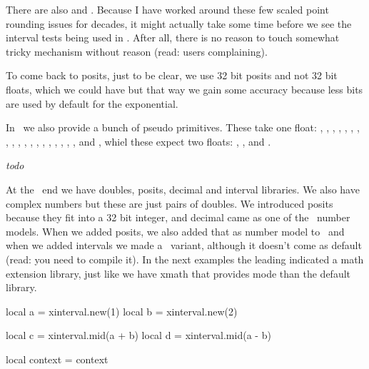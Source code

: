 \startpacked\darkblue \tttf \getbuffer \stoppacked

There are also \typ {\ifintervalfloat} and \typ{\ifintervalnum}. Because I have
worked around these few scaled point rounding issues for decades, it might
actually take some time before we see the interval tests being used in \CONTEXT.
After all, there is no reason to touch somewhat tricky mechanism without reason
(read: users complaining).

To come back to posits, just to be clear, we use 32 bit posits and not 32 bit
floats, which we could have but that way we gain some accuracy because less bits
are used by default for the exponential.

In \CONTEXT\ we also provide a bunch of pseudo primitives. These take one float:
\type {\pfsin}, \type {\pfcos}, \type {\pftan}, \type {\pfasin}, \type {\pfacos},
\type {\pfatan}, \type {\pfsinh}, \type {\pfcosh}, \type {\pftanh}, \type
{\pfasinh}, \type {\pfacosh}, \type {\pfatanh}, \type {\pfsqrt}, \type {\pflog},
\type {\pfexp}, \type {\pfceil}, \type {\pffloor}, \type {\pfround}, \type
{\pfabs}, \type {\pfrad} and \type {\pfdeg}, whiel these expect two floats: \type
{\pfatantwo}, \type {\pfpow}, \type {\pfmod} and \type {\pfrem}.


\stopsectionlevel

\startsectionlevel[title=Decimal]

{\em todo}

\stopsectionlevel

\startsectionlevel[title=Interval]

At the \LUA\ end we have doubles, posits, decimal and interval libraries. We also
have complex numbers but these are just pairs of doubles. We introduced posits
because they fit into a 32 bit integer, and decimal came as one of the \METAPOST\
number models. When we added posits, we also added that as number model to
\METAPOST\ and when we added intervals we made a \METAPOST\ variant, although it
doesn't come as default (read: you need to compile it). In the next examples the
leading \type {x} indicated a math extension library, just like we have \type
{xmath} that provides mode than the default \LUA\ \type {math} library.

\startbuffer
\startluacode
    local a = xinterval.new(1)
    local b = xinterval.new(2)

    local c = xinterval.mid(a + b)
    local d = xinterval.mid(a - b)

    local context = context

